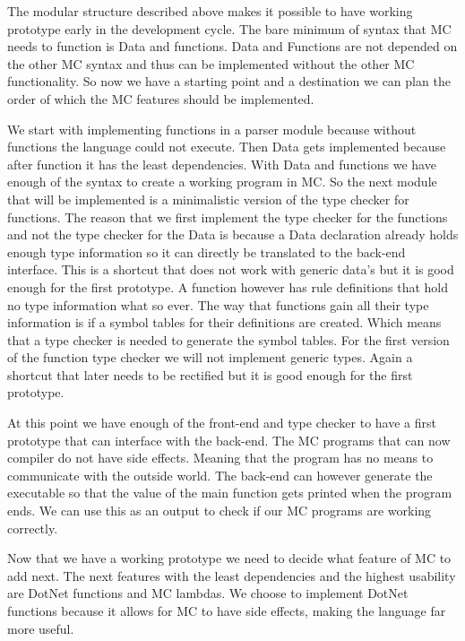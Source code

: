 The modular structure described above makes it possible to have working prototype early in the development cycle. The bare minimum of syntax that MC needs to function is Data and functions. Data and Functions are not depended on the other MC syntax and thus can be implemented without the other MC functionality. So now we have a starting point and a destination we can plan the order of which the MC features should be implemented.

We start with implementing functions in a parser module because without functions the language could not execute. 
Then Data gets implemented because after function it has the least dependencies.
With Data and functions we have enough of the syntax to create a working program in MC.
So the next module that will be implemented is a minimalistic version of the type checker for functions. The reason that we first implement the type checker for the functions and not the type checker for the Data is because  a Data declaration already holds enough type information so it can directly be translated to the back-end interface. This is a shortcut that does not work with generic data’s but it is good enough for the first prototype. A function however has rule definitions that hold no type information what so ever. The way that functions gain all their type information is if a symbol tables for their definitions are created. Which means that a type checker is needed to generate the symbol tables.
For the first version of the function type checker we will not implement generic types. Again a shortcut that later needs to be rectified but it is good enough for the first prototype. 

At this point we have enough of the front-end and type checker to have a first prototype that can interface with the back-end. The MC programs that can now compiler do not have side effects. Meaning that the program has no means to communicate with the outside world. The back-end can however generate the executable so that the value of the main function gets printed when the program ends. We can use this as an output to check if our MC programs are working correctly.

Now that we have a working prototype we need to decide what feature of MC to add next. The next features with the least dependencies and the highest usability are DotNet functions and MC lambdas. We choose to implement DotNet functions because it allows for MC to have side effects, making the language far more useful.

